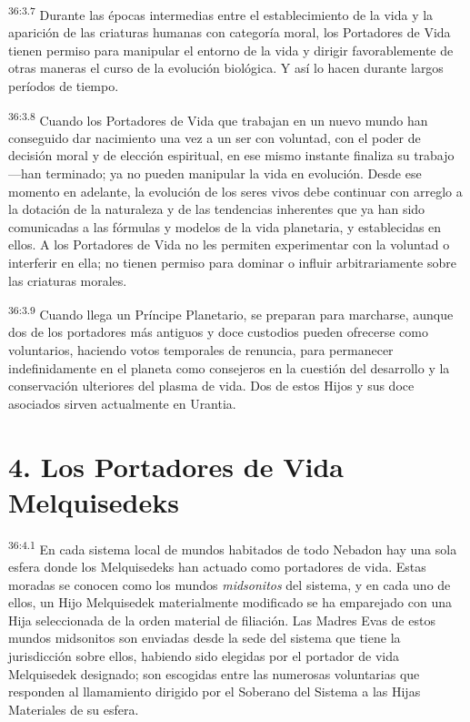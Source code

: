 \par
\textsuperscript{36:3.7} Durante las épocas intermedias entre el establecimiento de la vida y la aparición de las criaturas humanas con categoría moral, los Portadores de Vida tienen permiso para manipular el entorno de la vida y dirigir favorablemente de otras maneras el curso de la evolución biológica. Y así lo hacen durante largos períodos de tiempo.

\par
\textsuperscript{36:3.8} Cuando los Portadores de Vida que trabajan en un nuevo mundo han conseguido dar nacimiento una vez a un ser con voluntad, con el poder de decisión moral y de elección espiritual, en ese mismo instante finaliza su trabajo ---han terminado; ya no pueden manipular la vida en evolución. Desde ese momento en adelante, la evolución de los seres vivos debe continuar con arreglo a la dotación de la naturaleza y de las tendencias inherentes que ya han sido comunicadas a las fórmulas y modelos de la vida planetaria, y establecidas en ellos. A los Portadores de Vida no les permiten experimentar con la voluntad o interferir en ella; no tienen permiso para dominar o influir arbitrariamente sobre las criaturas morales.

\par
\textsuperscript{36:3.9} Cuando llega un Príncipe Planetario, se preparan para marcharse, aunque dos de los portadores más antiguos y doce custodios pueden ofrecerse como voluntarios, haciendo votos temporales de renuncia, para permanecer indefinidamente en el planeta como consejeros en la cuestión del desarrollo y la conservación ulteriores del plasma de vida. Dos de estos Hijos y sus doce asociados sirven actualmente en Urantia.

\section*{4. Los Portadores de Vida Melquisedeks}
\par
\textsuperscript{36:4.1} En cada sistema local de mundos habitados de todo Nebadon hay una sola esfera donde los Melquisedeks han actuado como portadores de vida. Estas moradas se conocen como los mundos \textit{midsonitos} del sistema, y en cada uno de ellos, un Hijo Melquisedek materialmente modificado se ha emparejado con una Hija seleccionada de la orden material de filiación. Las Madres Evas de estos mundos midsonitos son enviadas desde la sede del sistema que tiene la jurisdicción sobre ellos, habiendo sido elegidas por el portador de vida Melquisedek designado; son escogidas entre las numerosas voluntarias que responden al llamamiento dirigido por el Soberano del Sistema a las Hijas Materiales de su esfera.

